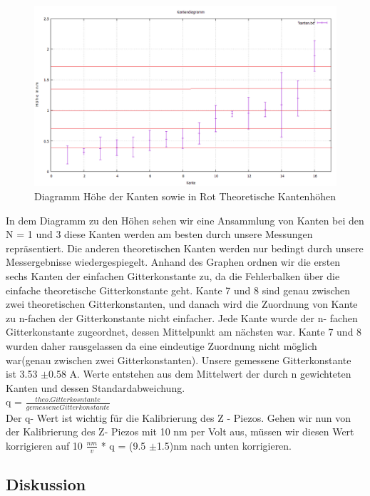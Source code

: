 \documentclass[10pt,a4paper]{article}
\begin{document}
\begin{figure}[]
	\includegraphics[scale = 0.5]{kantendia.png}
	\centering
	\caption{Diagramm Höhe der Kanten sowie in Rot Theoretische Kantenhöhen}
	\label{kantendia}
\end{figure}

In dem Diagramm zu den Höhen sehen wir eine Ansammlung von Kanten bei den N = 1 und 3 diese Kanten werden am besten durch unsere Messungen repräsentiert. Die anderen theoretischen Kanten werden nur bedingt durch unsere Messergebnisse wiedergespiegelt.
Anhand des Graphen ordnen wir die ersten sechs Kanten der einfachen Gitterkonstante zu, da die Fehlerbalken über die einfache theoretische Gitterkonstante geht. Kante 7 und 8 sind genau zwischen zwei theoretischen Gitterkonstanten, und danach wird die Zuordnung von Kante zu n-fachen der Gitterkonstante nicht einfacher.
Jede Kante wurde der n- fachen Gitterkonstante zugeordnet, dessen Mittelpunkt am nächsten war. Kante 7 und 8 wurden daher rausgelassen da eine eindeutige Zuordnung nicht möglich war(genau zwischen zwei Gitterkonstanten). Unsere gemessene Gitterkonstante ist 3.53 $\pm$0.58 A. Werte entstehen aus dem Mittelwert der durch n gewichteten Kanten und dessen Standardabweichung. \\ 
q =  $\frac {theo. Gitterkosntante} {gemessene Gitterkonstante}$\\
Der q- Wert ist wichtig für die Kalibrierung des Z - Piezos.
Gehen wir nun von der Kalibrierung des Z- Piezos mit 10 nm per Volt aus, müssen wir diesen Wert korrigieren auf 10 $\frac {nm} {v}$ * q = (9.5 $\pm$1.5)nm nach unten korrigieren.



\subsection{ Diskussion}
\end{document}
